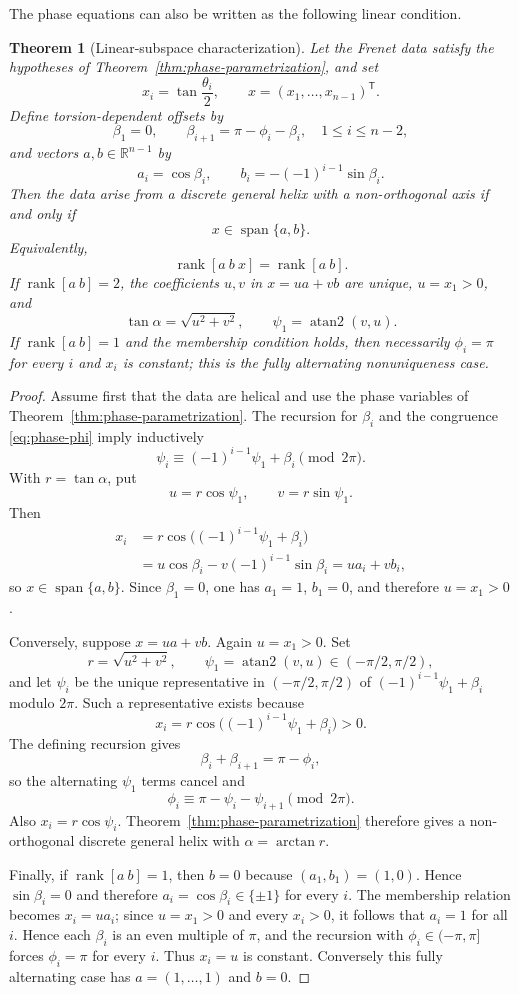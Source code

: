 \documentclass[10pt,a4paper]{amsart}
\newtheorem{theorem}{Theorem}[section]
\theoremstyle{definition}
\theoremstyle{remark}
\numberwithin{equation}{section}
\begin{document}
The phase equations can also be written as the following linear condition.

\begin{theorem}[Linear-subspace characterization]\label{thm:linear-subspace}
Let the Frenet data satisfy the hypotheses of Theorem~\ref{thm:phase-parametrization}, and set
\[
x_i=\tan\frac{\theta_i}{2},\qquad x=(x_1,\ldots,x_{n-1})^{\mathsf T}.
\]
Define torsion-dependent offsets by
\[
\beta_1=0,\qquad \beta_{i+1}=\pi-\phi_i-\beta_i,
\quad 1\le i\le n-2,
\]
and vectors $a,b\in\mathbb R^{n-1}$ by
\[
a_i=\cos\beta_i,
\qquad
b_i=-(-1)^{i-1}\sin\beta_i.
\]
Then the data arise from a discrete general helix with a non-orthogonal axis if and only if
\[
\boxed{\ x\in\operatorname{span}\{a,b\}.\ }
\]
Equivalently,
\[
\operatorname{rank}[a\ b\ x]=\operatorname{rank}[a\ b].
\]
If $\operatorname{rank}[a\ b]=2$, the coefficients $u,v$ in $x=ua+vb$ are unique, $u=x_1>0$, and
\[
\tan\alpha=\sqrt{u^2+v^2},
\qquad
\psi_1=\operatorname{atan2}(v,u).
\]
If $\operatorname{rank}[a\ b]=1$ and the membership condition holds, then necessarily $\phi_i=\pi$ for every $i$ and $x_i$ is constant; this is the fully alternating nonuniqueness case.
\end{theorem}

\begin{proof}
Assume first that the data are helical and use the phase variables of Theorem~\ref{thm:phase-parametrization}. The recursion for $\beta_i$ and the congruence \eqref{eq:phase-phi} imply inductively
\[
\psi_i\equiv(-1)^{i-1}\psi_1+\beta_i\pmod{2\pi}.
\]
With $r=\tan\alpha$, put
\[
u=r\cos\psi_1,\qquad v=r\sin\psi_1.
\]
Then
\[
\begin{aligned}
x_i
&=r\cos\bigl((-1)^{i-1}\psi_1+\beta_i\bigr)\\
&=u\cos\beta_i-v(-1)^{i-1}\sin\beta_i
=ua_i+vb_i,
\end{aligned}
\]
so $x\in\operatorname{span}\{a,b\}$. Since $\beta_1=0$, one has $a_1=1$, $b_1=0$, and therefore $u=x_1>0$.

Conversely, suppose $x=ua+vb$. Again $u=x_1>0$. Set
\[
r=\sqrt{u^2+v^2},\qquad \psi_1=\operatorname{atan2}(v,u)\in(-\pi/2,\pi/2),
\]
and let $\psi_i$ be the unique representative in $(-\pi/2,\pi/2)$ of
$(-1)^{i-1}\psi_1+\beta_i$ modulo $2\pi$. Such a representative exists because
\[
x_i=r\cos\bigl((-1)^{i-1}\psi_1+\beta_i\bigr)>0.
\]
The defining recursion gives
\[
\beta_i+\beta_{i+1}=\pi-\phi_i,
\]
so the alternating $\psi_1$ terms cancel and
\[
\phi_i\equiv\pi-\psi_i-\psi_{i+1}\pmod{2\pi}.
\]
Also $x_i=r\cos\psi_i$. Theorem~\ref{thm:phase-parametrization} therefore gives a non-orthogonal discrete general helix with $\alpha=\arctan r$.

Finally, if $\operatorname{rank}[a\ b]=1$, then $b=0$ because $(a_1,b_1)=(1,0)$. Hence $\sin\beta_i=0$ and therefore $a_i=\cos\beta_i\in\{\pm1\}$ for every $i$. The membership relation becomes $x_i=ua_i$; since $u=x_1>0$ and every $x_i>0$, it follows that $a_i=1$ for all $i$. Hence each $\beta_i$ is an even multiple of $\pi$, and the recursion with $\phi_i\in(-\pi,\pi]$ forces $\phi_i=\pi$ for every $i$. Thus $x_i=u$ is constant. Conversely this fully alternating case has $a=(1,\ldots,1)$ and $b=0$.
\end{proof}
\end{document}
